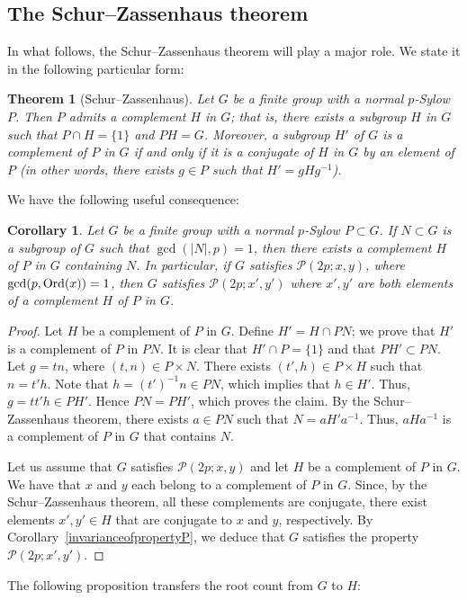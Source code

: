 \documentclass[12pt]{amsart}
\numberwithin{equation}{section}
\newcommand{\Ord}{{\rm Ord}}
\newtheorem{cor}[X]{Corollary}
\newtheorem{thm}[X]{Theorem}
\theoremstyle{definition}
\theoremstyle{remark}
\begin{document}
\subsection{The Schur--Zassenhaus theorem}
    In what follows, the Schur--Zassenhaus theorem will play a major role. We state it in the following particular form:
    \begin{thm}[Schur--Zassenhaus]
    Let $G$ be a finite group with a normal $p$-Sylow $P$. Then $P$ admits a complement $H$ in $G$; that is, there exists a subgroup $H$ in $G$ such that $P\cap H=\{1\}$ and $PH=G$. Moreover, a subgroup $H'$ of $G$ is a complement of $P$ in $G$ if and only if it is a conjugate of $H$ in $G$ by an element of $P$ (in other words, there exists $g\in P$ such that $H'=gHg^{-1}$). 
    \end{thm}
    We have the following useful consequence:
    \begin{cor}\label{SZapplication}
        Let $G$ be a finite group with a normal $p$-Sylow $P\subset G$. If $N\subset G$ is a subgroup of $G$ such that $\gcd(|N|,p)=1$, then there exists a complement $H$ of $P$ in $G$ containing $N$. In particular, if $G$ satisfies $\mathcal{P}(2p;x,y)$, where $\gcd(p,\Ord(x))=1$, then $G$ satisfies $\mathcal{P}(2p;x',y')$ where $x',y'$ are both elements of a complement $H$ of $P$ in $G$.
    \end{cor}
    \begin{proof}
        Let $H$ be a complement of $P$ in $G$. Define $H'=H\cap PN$; we prove that $H'$ is a complement of $P$ in $PN$. It is clear that $H'\cap P=\{1\}$ and that $PH'\subset PN$. Let $g=tn$, where $(t,n)\in P\times N$. There exists $(t',h)\in P\times H$ such that $n=t'h$. Note that $h=(t')^{-1}n\in PN$, which implies that $h\in H'$. Thus, $g=t t' h\in PH'$. Hence $PN=PH'$, which proves the claim. By the Schur--Zassenhaus theorem, there exists $a\in PN$ such that $N=aH'a^{-1}$. Thus, $aHa^{-1}$ is a complement of $P$ in $G$ that contains $N$.
        
        Let us assume that $G$ satisfies $\mathcal{P}(2p;x,y)$ and let $H$ be a complement of $P$ in $G$. We have that $x$ and $y$ each belong to a complement of $P$ in $G$. Since, by the Schur--Zassenhaus theorem, all these complements are conjugate, there exist elements $x',y'\in H$ that are conjugate to $x$ and $y$, respectively. By Corollary~\ref{invarianceofpropertyP}, we deduce that $G$ satisfies the property $\mathcal{P}(2p;x',y')$.
    \end{proof}
   The following proposition transfers the root count from $G$ to $H$:
\end{document}
